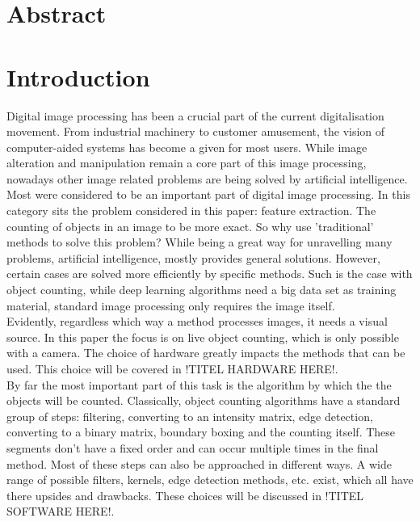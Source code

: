 \documentclass[11pt]{article}
\begin{document}


\section*{Abstract}
\thispagestyle{empty}

\newpage
\tableofcontents
\thispagestyle{empty}

\newpage
\listoftables
\thispagestyle{empty}

\newpage
\listoffigures
\thispagestyle{empty}

\newpage
\section{Introduction}
Digital image processing has been a crucial part of the current digitalisation movement. From industrial machinery to customer amusement, the vision of computer-aided systems has become a given for most users. While image alteration and manipulation remain a core part of this image processing, nowadays other image related problems are being solved by artificial intelligence. Most were considered to be an important part of digital image processing. In this category sits the problem considered in this paper: feature extraction. The counting of objects in an image to be more exact. So why use 'traditional' methods to solve this problem? While being a great way for unravelling many problems, artificial intelligence, mostly provides general solutions. However, certain cases are solved more efficiently by specific methods. Such is the case with object counting, while deep learning algorithms need a big data set as training material, standard image processing only requires the image itself.\\
Evidently, regardless which way a method processes images, it needs a visual source. In this paper the focus is on live object counting, which is only possible with a camera. The choice of hardware greatly impacts the methods that can be used. This choice will be covered in !TITEL HARDWARE HERE!.\\ 
By far the most important part of this task is the algorithm by which the the objects will be counted. Classically, object counting algorithms have a standard group of steps: filtering, converting to an intensity matrix, edge detection, converting to a binary matrix, boundary boxing and the counting itself. These segments don't have a fixed order and can occur multiple times in the final method. Most of these steps can also be approached in different ways. A wide range of possible filters, kernels, edge detection methods, etc. exist, which all have there upsides and drawbacks. These choices will be discussed in !TITEL SOFTWARE HERE!.
\end{document}
